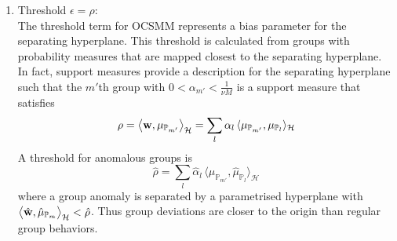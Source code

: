  \begin{enumerate}[4.]
\item  Threshold $\epsilon= \rho$: \\  The  threshold term for OCSMM represents a bias parameter for the separating  hyperplane. This threshold is calculated from   groups with probability measures that are mapped closest to the separating hyperplane. In fact,   support measures provide a description for the separating hyperplane such that the $m'$th group with $ 0 <\alpha_{m'} < \displaystyle \frac{1}{\nu M}$ is a support measure  that satisfies 
\[ \rho  %
 = \big\langle {\bf w},\mu_{\mathbb{P}_{m'} } \big \rangle_\mathcal{H}= \sum_{l} \alpha_l \, \langle \mu_{\mathbb{P}_{m'} }, \mu_{\mathbb{P}_l}\rangle_\mathcal{H}  \]
A threshold for anomalous groups is     \[\hat{\rho}=  \sum_{l} \hat{\alpha}_l \, \langle \hat{\mu}_{\mathbb{P}_{m'}}, \hat{\mu}_{\mathbb{P}_l}\rangle_\mathcal{H} \] 
where a group anomaly is separated by a parametrised hyperplane with
$   \big\langle \hat{\bf w},\hat{\mu}_{\mathbb{P}_m } \big \rangle_\mathcal{H}  < \hat{\rho}$. Thus group deviations are closer to the origin than regular group behaviors. 
 \end{enumerate}
 
 
 




%





